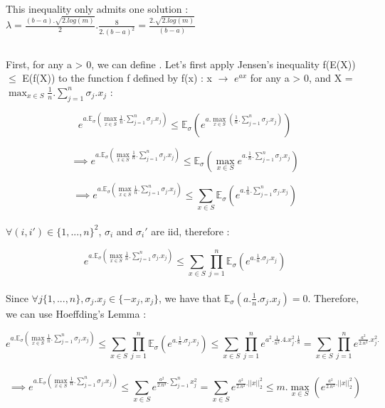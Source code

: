 \documentclass[final,3p,times,12pt]{article}
\begin{document}
This inequality only admits one solution : $\lambda = \frac{(b-a).\sqrt{2.log(m)}}{2}.\frac{8}{2.(b-a)^2} = \frac{2.\sqrt{2.log(m)}}{(b-a)}$

\subsection{} 

First, for any a > 0, we can define . Let's first apply Jensen's inequality f(E(X)) $\leq$ E(f(X)) to the function f defined by f(x) : x $\rightarrow$ $e^{ax}$ for any a > 0, and X = $\max_{x\in S} \frac{1}{n}.\sum_{j=1}^n \sigma_j.x_j$ : 

\[
e^{a.\mathbb{E}_{\sigma}\left(\max_{x\in S} \frac{1}{n}.\sum_{j=1}^n \sigma_j.x_j\right)} \leq \mathbb{E}_{\sigma}\left(e^{a.\max_{x\in S} (\frac{1}{n}.\sum_{j=1}^n \sigma_j.x_j)}\right)
\]

\[ \implies
e^{a.\mathbb{E}_{\sigma}\left(\max_{x\in S} \frac{1}{n}.\sum_{j=1}^n \sigma_j.x_j\right)} \leq \mathbb{E}_{\sigma}\left(\max_{x\in S}e^{a.\frac{1}{n}.\sum_{j=1}^n \sigma_j.x_j}\right)
\]

\[ \implies
e^{a.\mathbb{E}_{\sigma}\left(\max_{x\in S} \frac{1}{n}.\sum_{j=1}^n \sigma_j.x_j\right)} \leq \sum_{x\in S}\mathbb{E}_{\sigma}\left(e^{a.\frac{1}{n}.\sum_{j=1}^n \sigma_j.x_j}\right)
\] \\

$\forall (i,i') \in \{1, ...,n\}^2$, $\sigma_i$ and  $\sigma_i'$ are iid, therefore : 

\[
e^{a.\mathbb{E}_{\sigma}\left(\max_{x\in S} \frac{1}{n}.\sum_{j=1}^n \sigma_j.x_j\right)} \leq  \sum_{x\in S}\prod_{j=1}^n\mathbb{E}_{\sigma}\left(e^{a.\frac{1}{n}. \sigma_j.x_j}\right)
\] \\

Since $\forall j \{1, ..., n\}, \sigma_j.x_j \in \{-x_j,x_j\}$, we have that $\mathbb{E}_{\sigma}\left(a.\frac{1}{n}. \sigma_j.x_j\right) = 0$. Therefore, we can use Hoeffding’s Lemma : 

\[
e^{a.\mathbb{E}_{\sigma}\left(\max_{x\in S} \frac{1}{n}.\sum_{j=1}^n \sigma_j.x_j\right)} \leq  \sum_{x\in S}\prod_{j=1}^n\mathbb{E}_{\sigma}\left(e^{a.\frac{1}{n}. \sigma_j.x_j}\right) \leq \sum_{x\in S}\prod_{j=1}^n e^{a^2.\frac{1}{n^2}. 4.x_j^2.\frac{1}{8}} = \sum_{x\in S}\prod_{j=1}^n e^{\frac{a^2}{2.n^2}.x_j^2.}
\] \\

\[ \implies
e^{a.\mathbb{E}_{\sigma}\left(\max_{x\in S} \frac{1}{n}.\sum_{j=1}^n \sigma_j.x_j\right)} \leq \sum_{x\in S} e^{\frac{a^2}{2.n^2}.\sum_{j=1}^nx_j^2} = \sum_{x\in S} e^{\frac{a^2}{2.n^2}.||x||_2^2} \leq m.\max_{x\in S}\left(e^{\frac{a^2}{2.n^2}.||x||_2^2}\right)
\] \\
\end{document}
